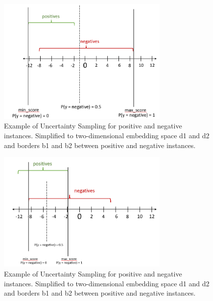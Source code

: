 \begin{figure}[t]
  \centering
    \includegraphics[width=0.75\textwidth]{figures/positives_negatives1.PNG}
  \caption{Example of Uncertainty Sampling for positive and negative instances. Simplified to two-dimensional embedding space d1 and d2 and borders b1 and b2 between positive and negative instances.}
  \label{fig:informativeinstances}
\end{figure}


\begin{figure}[t]
  \centering
    \includegraphics[width=0.75\textwidth]{figures/positives_negatives2.PNG}
  \caption{Example of Uncertainty Sampling for positive and negative instances. Simplified to two-dimensional embedding space d1 and d2 and borders b1 and b2 between positive and negative instances.}
  \label{fig:informativeinstances}
\end{figure}





